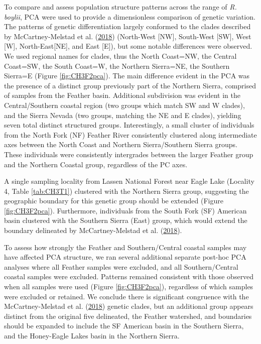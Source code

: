 \documentclass[proquest,12pt,final]{ucthesis-CA2012} %
\begin{document}
\begin{ucmainmatter}
To compare and assess population structure patterns across the range of
\emph{R. boylii}, PCA were used to provide a dimensionless comparison of
genetic variation. The patterns of genetic differentiation largely
conformed to the clades described by McCartney-Melstad et al.
(\protect\hyperlink{ref-mccartney-melstad_population_2018}{2018})
(North-West {[}NW{]}, South-West {[}SW{]}, West {[}W{]},
North-East{[}NE{]}, and East {[}E{]}), but some notable differences were
observed. We used regional names for clades, thus the North Coast=NW,
the Central Coast=SW, the South Coast=W, the Northern Sierra=NE, the
Southern Sierra=E (Figure \ref{fig:CH3F2pca}). The main difference
evident in the PCA was the presence of a distinct group previously part
of the Northern Sierra, comprised of samples from the Feather basin.
Additional subdivision was evident in the Central/Southern coastal
region (two groups which match SW and W clades), and the Sierra Nevada
(two groups, matching the NE and E clades), yielding seven total
distinct structured groups. Interestingly, a small cluster of
individuals from the North Fork (NF) Feather River consistently
clustered along intermediate axes between the North Coast and Northern
Sierra/Southern Sierra groups. These individuals were consistently
intergrades between the larger Feather group and the Northern Coastal
group, regardless of the PC axes.

A single sampling locality from Lassen National Forest near Eagle Lake
(Locality 4, Table \ref{tab:CH3T1}) clustered with the Northern Sierra
group, suggesting the geographic boundary for this genetic group should
be extended (Figure \ref{fig:CH3F2pca}). Furthermore, individuals from
the South Fork (SF) American basin clustered with the Southern Sierra
(East) group, which would extend the boundary delineated by
McCartney-Melstad et al.
(\protect\hyperlink{ref-mccartney-melstad_population_2018}{2018}).

To assess how strongly the Feather and Southern/Central coastal samples
may have affected PCA structure, we ran several additional separate
post-hoc PCA analyses where all Feather samples were excluded, and all
Southern/Central coastal samples were excluded. Patterns remained
consistent with those observed when all samples were used (Figure
\ref{fig:CH3F2pca}), regardless of which samples were excluded or
retained. We conclude there is significant congruence with the
McCartney-Melstad et al.
(\protect\hyperlink{ref-mccartney-melstad_population_2018}{2018})
genetic clades, but an additional group appears distinct from the
original five delineated, the Feather watershed, and boundaries should
be expanded to include the SF American basin in the Southern Sierra, and
the Honey-Eagle Lakes basin in the Northern Sierra.










\end{ucmainmatter}
\end{document}
